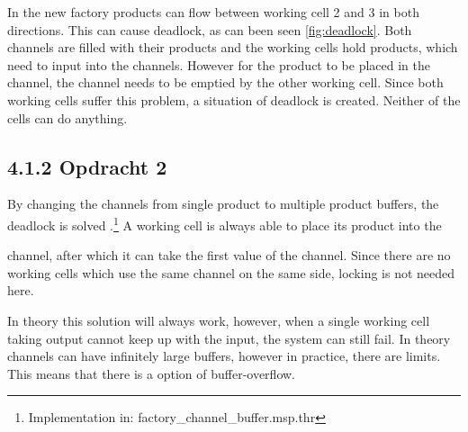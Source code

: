 \documentclass[a4paper,12px]{article}
\begin{document}
In the new factory products can flow between working cell 2 and 3 in both
directions. This can cause deadlock, as can been seen \autoref{fig:deadlock}.
Both channels are filled with their products and the working cells hold
products, which need to input into the channels. However for the product to be
placed in the channel, the channel needs to be emptied by the other working
cell. Since both working cells suffer this problem, a situation of deadlock is
created. Neither of the cells can do anything.

\subsection{4.1.2 Opdracht 2}

By changing the channels from single product to multiple product buffers, the
deadlock is solved .\footnote{Implementation in:
factory\_channel\_buffer.msp.thr} A working cell is always able to place its
product into the

channel, after which it can take the first value of the channel. Since there
are no working cells which use the same channel on the same side, locking is
not needed here.

In theory this solution will always work, however, when a single working cell
taking output cannot keep up with the input, the system can still fail. In
theory channels can have infinitely large buffers, however in practice, there
are limits. This means that there is a option of buffer-overflow.



% 
% 
\end{document}
